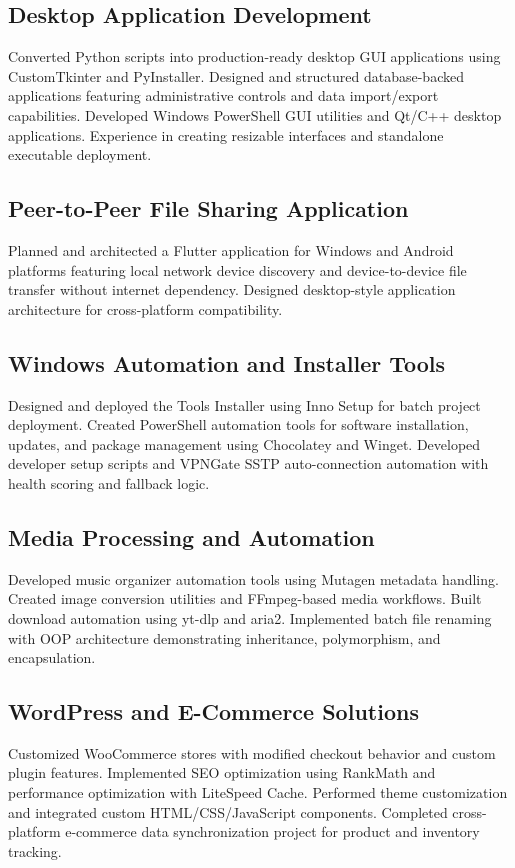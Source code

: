 \documentclass[11pt,letterpaper]{article}
\begin{document}
\subsection*{Desktop Application Development}
Converted Python scripts into production-ready desktop GUI applications using CustomTkinter and PyInstaller. Designed and structured database-backed applications featuring administrative controls and data import/export capabilities. Developed Windows PowerShell GUI utilities and Qt/C++ desktop applications. Experience in creating resizable interfaces and standalone executable deployment.

\subsection*{Peer-to-Peer File Sharing Application}
Planned and architected a Flutter application for Windows and Android platforms featuring local network device discovery and device-to-device file transfer without internet dependency. Designed desktop-style application architecture for cross-platform compatibility.

\subsection*{Windows Automation and Installer Tools}
Designed and deployed the Tools Installer using Inno Setup for batch project deployment. Created PowerShell automation tools for software installation, updates, and package management using Chocolatey and Winget. Developed developer setup scripts and VPNGate SSTP auto-connection automation with health scoring and fallback logic.

\subsection*{Media Processing and Automation}
Developed music organizer automation tools using Mutagen metadata handling. Created image conversion utilities and FFmpeg-based media workflows. Built download automation using yt-dlp and aria2. Implemented batch file renaming with OOP architecture demonstrating inheritance, polymorphism, and encapsulation.

\subsection*{WordPress and E-Commerce Solutions}
Customized WooCommerce stores with modified checkout behavior and custom plugin features. Implemented SEO optimization using RankMath and performance optimization with LiteSpeed Cache. Performed theme customization and integrated custom HTML/CSS/JavaScript components. Completed cross-platform e-commerce data synchronization project for product and inventory tracking.
\end{document}
